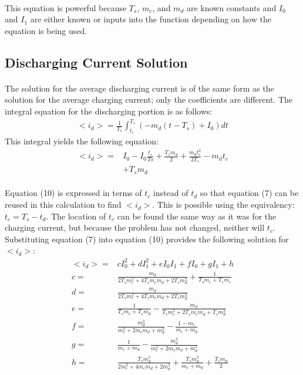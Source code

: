\documentclass[10pt]{article}
\begin{document}
\paragraph{}
This equation is powerful because \(T_s\), \(m_c\), and \(m_d\) are known constants and \(I_0\) and \(I_1\) are either known or inputs into the function depending on how the equation is being used.
\subsection{Discharging Current Solution}
\paragraph{}
The solution for the average discharging current is of the same form as the solution for the average charging current; only the coefficients are different. The integral equation for the discharging portion is as follows:
\begin{align}
    <i_d> = \frac{1}{T_s}\int_{t_c}^{T_s}(-m_d(t-T_s)+I_0)dt
\end{align}
This integral yields the following equation:
\begin{align}
    <i_d> = & I_0-I_0\frac{t_c}{Ts}+\frac{T_sm_d}{2}+\frac{m_dt_c^2}{2T_s}-m_dt_c\nonumber\\&+T_sm_d
\end{align}
\paragraph{}
Equation (10) is expressed in terms of \(t_c\) instead of \(t_d\) so that equation (7) can be reused in this calculation to find \(<i_d>\). This is possible using the equivalency: \(t_c = T_s-t_d\). The location of \(t_c\) can be found the same way as it was for the charging current, but because the problem has not changed, neither will \(t_c\). Substituting equation (7) into equation (10) provides the following solution for \(<i_d>\):
\begin{align}
    <i_d> = & cI_0^2+dI_1^2+eI_0I_1+fI_0+gI_1+h\nonumber\\
    c = & \frac{m_d}{2T_sm_c^2+4T_sm_cm_d+2T_sm_d^2}+\frac{1}{T_sm_c+T_sm_c}\nonumber\\
    d = & \frac{m_d}{2T_sm_c^2+4T_sm_cm_d+2T_sm_d^2}\nonumber\\
    e = & \frac{1}{T_sm_c+T_sm_d}-\frac{m_d}{T_sm_c^2+2T_sm_cm_d+T_sm_d^2}\nonumber\\
    f = & \frac{m_d^2}{m_c^2+2m_cm_d+m_d^2}-\frac{1-m_c}{m_c+m_d}\nonumber\\
    g = & \frac{1}{m_c+m_d}-\frac{m_d^2}{m_c^2+2m_cm_d+m_d^2}\nonumber\\
    h = & \frac{T_sm_d^3}{2m_c^2+4m_cm_d+2m_d^2}+\frac{T_sm_d^2}{m_c+m_d}+\frac{T_sm_d}{2}
\end{align}
\end{document}
